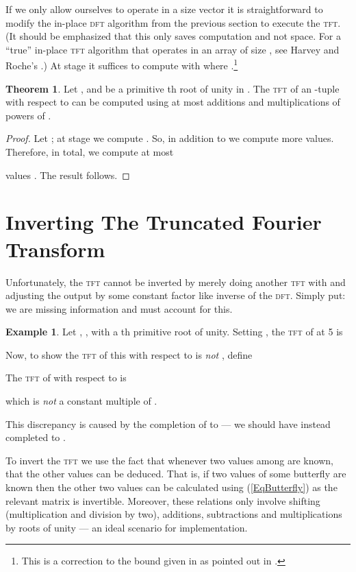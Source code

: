 \documentclass[12pt]{article}
\theoremstyle{definition}
\newcommand{\0}{\mathbf{0}}
\theoremstyle{theorem}
\newtheorem{theorem}{Theorem}
\theoremstyle{definition}
\newtheorem*{example}{Example}
\begin{document}
If we only allow ourselves to operate in a size  vector it is straightforward to modify the in-place \textsc{dft} algorithm from the previous section to execute the \textsc{tft}. (It should be emphasized that this only saves computation and not space. For a ``true'' in-place \textsc{tft} algorithm that operates in an array of size , see Harvey and Roche's \cite{InPlaceTFT}.) At stage  it suffices to compute 
 with  where .\footnote{This is a correction to the bound given in \cite{TFT1} as pointed out in \cite{TFT2}.}

\begin{theorem}
Let ,  and  be a primitive th root of unity in . The \textsc{tft} of an -tuple  with respect to  can be computed using at most  additions and  multiplications of powers of .
\end{theorem}

\begin{proof}
Let ; at stage  we compute . So, in addition to  we compute  more values. Therefore, in total, we compute at most 

values . The result follows.
\end{proof}

\section{Inverting The Truncated Fourier Transform}\label{Section::InvTFT}
Unfortunately, the \textsc{tft} cannot be inverted by merely doing another \textsc{tft} with  and adjusting the output by some constant factor like inverse of the \textsc{dft}. Simply put: we are missing information and must account for this.

\begin{example}
Let , , with  a th primitive root of unity. Setting , the \textsc{tft} of  at 5 is

Now, to show the \textsc{tft} of this with respect to  is \emph{not} , define 

The \textsc{tft} of  with respect to  is

which is \emph{not} a constant multiple of .

This discrepancy is caused by the completion of  to  --- we should have instead completed  to .\end{example}

To invert the \textsc{tft} we 
use the fact that whenever two values among  are known, that the other values can be deduced. That is, if two values of some butterfly are known then the other two values can be calculated using (\ref{EqButterfly}) as the relevant matrix is invertible. Moreover, these relations only involve shifting (multiplication and division by two), additions, subtractions and multiplications by roots of unity --- an ideal scenario for implementation.
\end{document}
